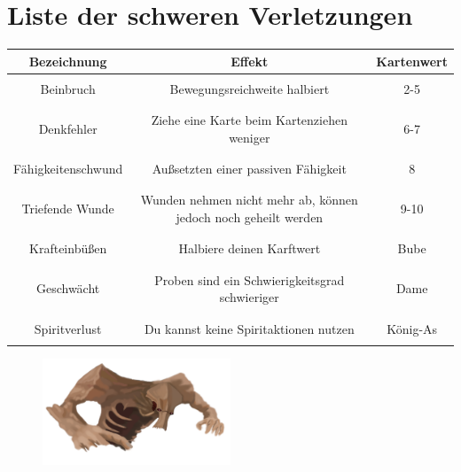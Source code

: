 \section*{Liste der schweren Verletzungen}
\begin{table}[htpb]
    \centering
    \begin{tabular}{|c|c|c|}
        \hline
        \textbf{Bezeichnung} & \textbf{Effekt} & \textbf{Kartenwert}\\
        \hline
        \hline
         & &\\
        Beinbruch & Bewegungsreichweite halbiert & 2-5 \\
         & &\\
        \hline
         & &\\
        Denkfehler &  Ziehe eine Karte beim Kartenziehen weniger & 6-7 \\
         & &\\
        \hline
         & &\\
        Fähigkeitenschwund & Außsetzten einer passiven Fähigkeit & 8\\
         & &\\
        \hline
         & &\\
        Triefende Wunde & Wunden nehmen nicht mehr ab, können jedoch noch geheilt werden & 9-10\\
         & &\\
        \hline
         & &\\
        Krafteinbüßen & Halbiere deinen Karftwert & Bube \\
         & &\\
        \hline
         & &\\
        Geschwächt & Proben sind ein Schwierigkeitsgrad schwieriger & Dame\\ 
         & &\\
        \hline
         & &\\
        Spiritverlust & Du kannst keine Spiritaktionen nutzen & König-As\\
         & &\\
        \hline
    \end{tabular}
    \label{tab:schwere_Verletzungen}
\end{table}
\begin{figure}[b]
    \centering
    \includegraphics[width = 0.5\textwidth]{Pictures/Witchscreamer.png}
    \label{fig:Howler}
\end{figure}
